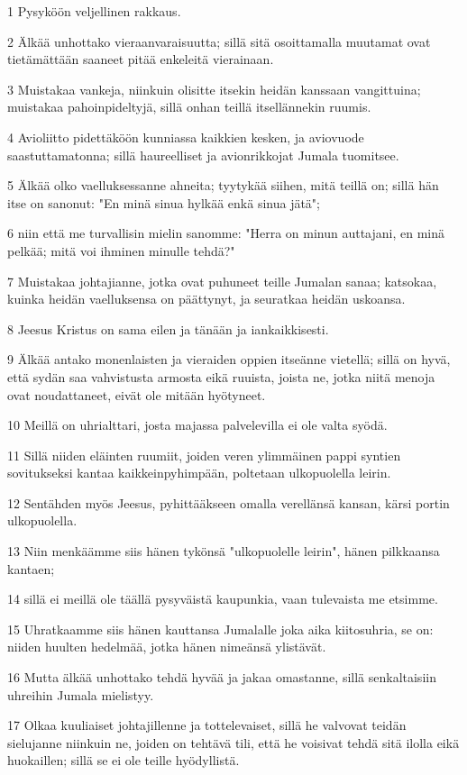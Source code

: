 \par 1 Pysyköön veljellinen rakkaus.
\par 2 Älkää unhottako vieraanvaraisuutta; sillä sitä osoittamalla muutamat ovat tietämättään saaneet pitää enkeleitä vierainaan.
\par 3 Muistakaa vankeja, niinkuin olisitte itsekin heidän kanssaan vangittuina; muistakaa pahoinpideltyjä, sillä onhan teillä itsellännekin ruumis.
\par 4 Avioliitto pidettäköön kunniassa kaikkien kesken, ja aviovuode saastuttamatonna; sillä haureelliset ja avionrikkojat Jumala tuomitsee.
\par 5 Älkää olko vaelluksessanne ahneita; tyytykää siihen, mitä teillä on; sillä hän itse on sanonut: "En minä sinua hylkää enkä sinua jätä";
\par 6 niin että me turvallisin mielin sanomme: "Herra on minun auttajani, en minä pelkää; mitä voi ihminen minulle tehdä?"
\par 7 Muistakaa johtajianne, jotka ovat puhuneet teille Jumalan sanaa; katsokaa, kuinka heidän vaelluksensa on päättynyt, ja seuratkaa heidän uskoansa.
\par 8 Jeesus Kristus on sama eilen ja tänään ja iankaikkisesti.
\par 9 Älkää antako monenlaisten ja vieraiden oppien itseänne vietellä; sillä on hyvä, että sydän saa vahvistusta armosta eikä ruuista, joista ne, jotka niitä menoja ovat noudattaneet, eivät ole mitään hyötyneet.
\par 10 Meillä on uhrialttari, josta majassa palvelevilla ei ole valta syödä.
\par 11 Sillä niiden eläinten ruumiit, joiden veren ylimmäinen pappi syntien sovitukseksi kantaa kaikkeinpyhimpään, poltetaan ulkopuolella leirin.
\par 12 Sentähden myös Jeesus, pyhittääkseen omalla verellänsä kansan, kärsi portin ulkopuolella.
\par 13 Niin menkäämme siis hänen tykönsä "ulkopuolelle leirin", hänen pilkkaansa kantaen;
\par 14 sillä ei meillä ole täällä pysyväistä kaupunkia, vaan tulevaista me etsimme.
\par 15 Uhratkaamme siis hänen kauttansa Jumalalle joka aika kiitosuhria, se on: niiden huulten hedelmää, jotka hänen nimeänsä ylistävät.
\par 16 Mutta älkää unhottako tehdä hyvää ja jakaa omastanne, sillä senkaltaisiin uhreihin Jumala mielistyy.
\par 17 Olkaa kuuliaiset johtajillenne ja tottelevaiset, sillä he valvovat teidän sielujanne niinkuin ne, joiden on tehtävä tili, että he voisivat tehdä sitä ilolla eikä huokaillen; sillä se ei ole teille hyödyllistä.
